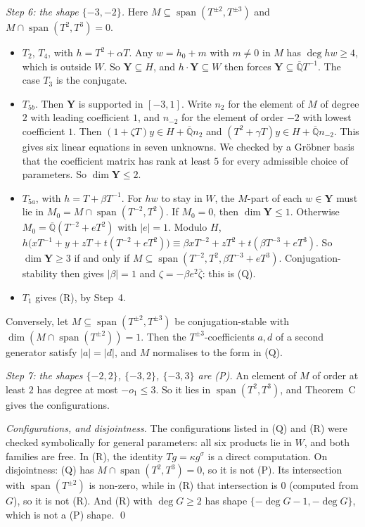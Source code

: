 \documentclass[11pt,a4paper]{article}
\theoremstyle{plain}
\theoremstyle{definition}
\newcommand{\Qbar}{\overline{\mathbb{Q}}}
\newcommand{\spn}{\operatorname{span}}
\begin{document}
\emph{Step 6: the shape $\{-3,-2\}$.} Here $M\subseteq\spn(T^{\pm2},T^{\pm3})$ and
$M\cap\spn(T^{2},T^{3})=0$.
\begin{itemize}
\item $T_{2}$, $T_{4}$, with $h=T^{2}+\alpha T$. Any $w=h_{0}+m$ with $m\neq0$ in $M$
has $\deg hw\ge4$, which is outside $W$. So $\mathbf Y\subseteq H$, and
$h\cdot\mathbf Y\subseteq W$ then forces $\mathbf Y\subseteq\Qbar T^{-1}$. The case $T_{3}$ is the
conjugate.
\item $T_{5b}$. Then $\mathbf Y$ is supported in $[-3,1]$. Write $n_{2}$ for the element of
$M$ of degree $2$ with leading coefficient $1$, and $n_{-2}$ for the element of order
$-2$ with lowest coefficient $1$. Then $(1+\zeta T)y\in H+\Qbar n_{2}$ and
$(T^{2}+\gamma T)y\in H+\Qbar n_{-2}$. This gives six linear equations in seven unknowns.
We checked by a Gr\"obner basis that the coefficient matrix has rank at least $5$ for
every admissible choice of parameters. So $\dim\mathbf Y\le2$.
\item $T_{5a}$, with $h=T+\beta T^{-1}$. For $hw$ to stay in $W$, the $M$-part of each
$w\in\mathbf Y$ must lie in $M_{0}=M\cap\spn(T^{-2},T^{2})$. If $M_{0}=0$, then
$\dim\mathbf Y\le1$. Otherwise $M_{0}=\Qbar(T^{-2}+eT^{2})$ with $|e|=1$. Modulo $H$,
$h\bigl(xT^{-1}+y+zT+t(T^{-2}+eT^{2})\bigr)\equiv\beta xT^{-2}+zT^{2}+t(\beta T^{-3}+eT^{3})$.
So $\dim\mathbf Y\ge3$ if and only if
$M\subseteq\spn(T^{-2},T^{2},\beta T^{-3}+eT^{3})$. Conjugation-stability then gives
$|\beta|=1$ and $\zeta=-\beta e^{2}\bar\zeta$: this is (Q).
\item $T_{1}$ gives (R), by Step~4.
\end{itemize}
Conversely, let $M\subseteq\spn(T^{\pm2},T^{\pm3})$ be conjugation-stable with
$\dim(M\cap\spn(T^{\pm2}))=1$. Then the $T^{\pm3}$-coefficients $a,d$ of a second generator
satisfy $|a|=|d|$, and $M$ normalises to the form in (Q).

\emph{Step 7: the shapes $\{-2,2\}$, $\{-3,2\}$, $\{-3,3\}$ are (P).} An element of $M$ of
order at least $2$ has degree at most $-o_{1}\le3$. So it lies in $\spn(T^{2},T^{3})$, and
Theorem~C gives the configurations.

\emph{Configurations, and disjointness.} The configurations listed in (Q) and (R) were
checked symbolically for general parameters: all six products lie in $W$, and both
families are free. In (R), the identity $Tg=\kappa g^{\sigma}$ is a direct computation. On
disjointness: (Q) has $M\cap\spn(T^{2},T^{3})=0$, so it is not (P). Its intersection
with $\spn(T^{\pm2})$ is non-zero, while in (R) that intersection is $0$ (computed from
$G$), so it is not (R). And (R) with $\deg G\ge2$ has shape $\{-\deg G-1,-\deg G\}$, which
is not a (P) shape. \qed
\end{document}
